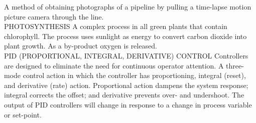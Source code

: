 A method of obtaining photographs of a pipeline by pulling a time-lapse motion picture camera through the line. 
\vspace{0.3cm}\\
PHOTOSYNTHESIS
A complex process in all green plants that contain chlorophyll. The process uses sunlight as energy to convert carbon dioxide into plant growth. As a by-product oxygen is released.
\vspace{0.3cm}\\
PID (PROPORTIONAL, INTEGRAL, DERIVATIVE) CONTROL
Controllers are designed to eliminate the need for continuous operator attention. A three-mode control action in which the controller has proportioning, integral (reset), and derivative (rate) action. Proportional action dampens the system response; integral corrects the offset; and derivative prevents over- and undershoot.  The output of PID controllers will change in response to a change in process variable or set-point.
\vspace{0.3cm}\\


